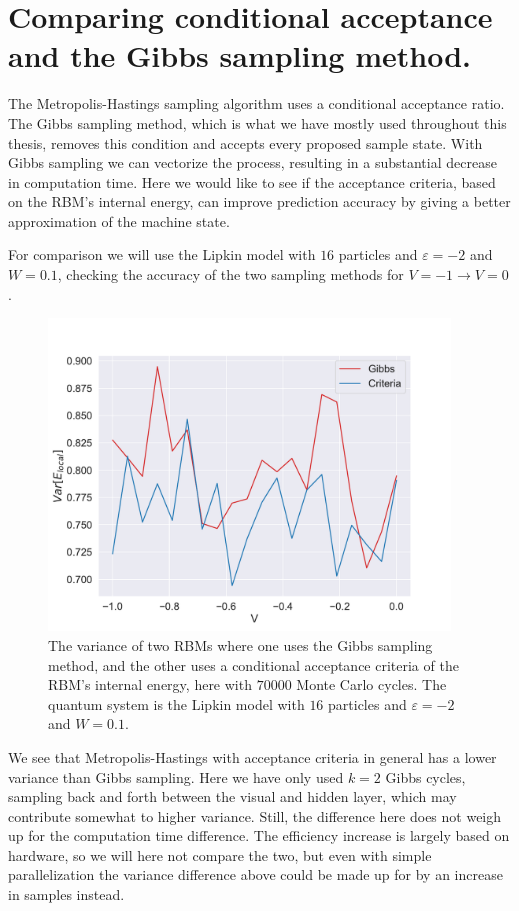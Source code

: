 \section{Comparing conditional acceptance and the Gibbs sampling method.}

The Metropolis-Hastings sampling algorithm uses a conditional acceptance ratio. The Gibbs sampling method, which is what we have mostly used throughout this thesis, removes this condition and accepts every proposed sample state. With Gibbs sampling we can vectorize the process, resulting in a substantial decrease in computation time. Here we would like to see if the acceptance criteria, based on the RBM's internal energy, can improve prediction accuracy by giving a better approximation of the machine state. 

\def \mgeps {-2}
\def \mgW {0.1}
\def \mgC {70000}

For comparison we will use the Lipkin model with $16$ particles and $\varepsilon = \mgeps$ and $W = \mgW$, checking the accuracy of the two sampling methods for $V = -1 \rightarrow V = 0$. 

\begin{figure}[H]
  \begin{center}
    \includegraphics[width=0.95\textwidth]{Figures/Plots/met_gibbs_V.pdf}
  \end{center}
  \caption{The variance of two RBMs where one uses the Gibbs sampling method, and the other uses a conditional acceptance criteria of the RBM's internal energy, here with $\mgC$ Monte Carlo cycles. The quantum system is the Lipkin model with $16$ particles and $\varepsilon = \mgeps$ and $W = \mgW$.}
\end{figure}

We see that Metropolis-Hastings with acceptance criteria in general has a lower variance than Gibbs sampling. Here we have only used $k = 2$ Gibbs cycles, sampling back and forth between the visual and hidden layer, which may contribute somewhat to higher variance. Still, the difference here does not weigh up for the computation time difference. The efficiency increase is largely based on hardware, so we will here not compare the two, but even with simple parallelization the variance difference above could be made up for by an increase in samples instead.



